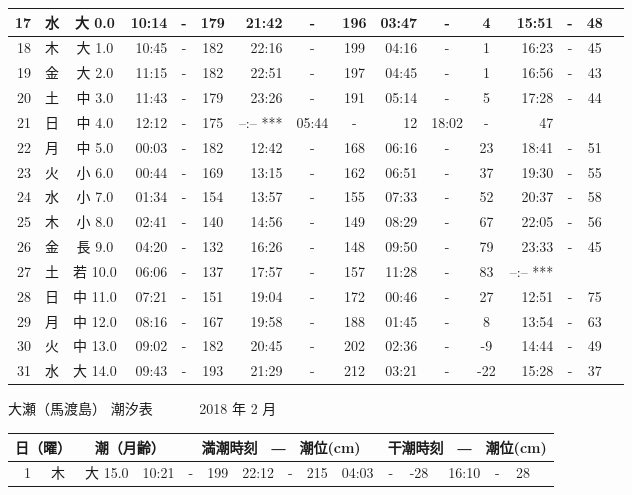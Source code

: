 \documentclass[12pt.a4j]{jsarticle}
\begin{document}
\begin{center}
\begin{table}[ht]
\begin{tabular}{|rc|cr|ccrccr|ccrccr|}
\hline
17 & 水 & 大  0.0 & 10:14 &-& 179 & 21:42 &-& 196 & 03:47 &-&   4 & 15:51 &-&  48 \\
\hline
18 & 木 & 大  1.0 & 10:45 &-& 182 & 22:16 &-& 199 & 04:16 &-&   1 & 16:23 &-&  45 \\
\hline
19 & 金 & 大  2.0 & 11:15 &-& 182 & 22:51 &-& 197 & 04:45 &-&   1 & 16:56 &-&  43 \\
\hline
20 & 土 & 中  3.0 & 11:43 &-& 179 & 23:26 &-& 191 & 05:14 &-&   5 & 17:28 &-&  44 \\
\hline
21 & 日 & 中  4.0 & 12:12 &-& 175 & --:--   *** & 05:44 &-&  12 & 18:02 &-&  47 \\
\hline
22 & 月 & 中  5.0 & 00:03 &-& 182 & 12:42 &-& 168 & 06:16 &-&  23 & 18:41 &-&  51 \\
\hline
23 & 火 & 小  6.0 & 00:44 &-& 169 & 13:15 &-& 162 & 06:51 &-&  37 & 19:30 &-&  55 \\
\hline
24 & 水 & 小  7.0 & 01:34 &-& 154 & 13:57 &-& 155 & 07:33 &-&  52 & 20:37 &-&  58 \\
\hline
25 & 木 & 小  8.0 & 02:41 &-& 140 & 14:56 &-& 149 & 08:29 &-&  67 & 22:05 &-&  56 \\
\hline
26 & 金 & 長  9.0 & 04:20 &-& 132 & 16:26 &-& 148 & 09:50 &-&  79 & 23:33 &-&  45 \\
\hline
27 & 土 & 若 10.0 & 06:06 &-& 137 & 17:57 &-& 157 & 11:28 &-&  83 & --:--   *** \\
\hline
28 & 日 & 中 11.0 & 07:21 &-& 151 & 19:04 &-& 172 & 00:46 &-&  27 & 12:51 &-&  75 \\
\hline
29 & 月 & 中 12.0 & 08:16 &-& 167 & 19:58 &-& 188 & 01:45 &-&   8 & 13:54 &-&  63 \\
\hline
30 & 火 & 中 13.0 & 09:02 &-& 182 & 20:45 &-& 202 & 02:36 &-&  -9 & 14:44 &-&  49 \\
\hline
31 & 水 & 大 14.0 & 09:43 &-& 193 & 21:29 &-& 212 & 03:21 &-& -22 & 15:28 &-&  37 \\
\hline
\end{tabular}
\end{table}
\newpage
 {\LARGE 大瀬（馬渡島）  潮汐表　　　}
 {\large 2018 年  2 月}\\
 \begin{table}[ht]
 \begin{tabular}{|rc|cr|ccrccr|ccrccr|}
 \hline
 \multicolumn{2}{|c|}{日（曜）} & \multicolumn{2}{c|}{潮（月齢）} & \multicolumn{6}{c|}{満潮時刻　―　潮位(cm)} & \multicolumn{6}{c|}{干潮時刻　―　潮位(cm)} \\
 \hline
 1 & 木 & 大 15.0 & 10:21 &-& 199 & 22:12 &-& 215 & 04:03 &-& -28 & 16:10 &-&  28 \\

\end{tabular}
\end{table}
\end{center}
\end{document}
